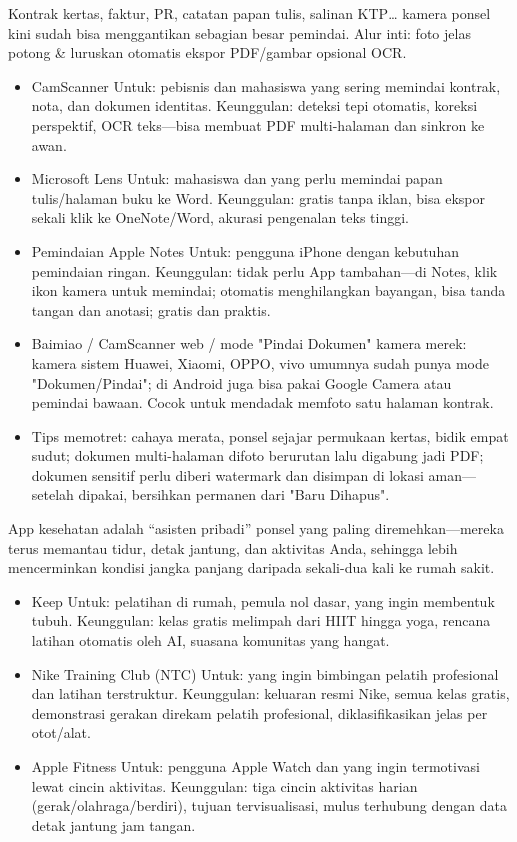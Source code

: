 Kontrak kertas, faktur, PR, catatan papan tulis, salinan KTP… kamera ponsel kini sudah bisa menggantikan sebagian besar pemindai. Alur inti: foto jelas potong \& luruskan otomatis ekspor PDF/gambar opsional OCR.

\begin{itemize}
  \item CamScanner Untuk: pebisnis dan mahasiswa yang sering memindai kontrak, nota, dan dokumen identitas. Keunggulan: deteksi tepi otomatis, koreksi perspektif, OCR teks—bisa membuat PDF multi-halaman dan sinkron ke awan.
  \item Microsoft Lens Untuk: mahasiswa dan yang perlu memindai papan tulis/halaman buku ke Word. Keunggulan: gratis tanpa iklan, bisa ekspor sekali klik ke OneNote/Word, akurasi pengenalan teks tinggi.
  \item Pemindaian Apple Notes Untuk: pengguna iPhone dengan kebutuhan pemindaian ringan. Keunggulan: tidak perlu App tambahan—di Notes, klik ikon kamera untuk memindai; otomatis menghilangkan bayangan, bisa tanda tangan dan anotasi; gratis dan praktis.
  \item Baimiao / CamScanner web / mode "Pindai Dokumen" kamera merek: kamera sistem Huawei, Xiaomi, OPPO, vivo umumnya sudah punya mode "Dokumen/Pindai"; di Android juga bisa pakai Google Camera atau pemindai bawaan. Cocok untuk mendadak memfoto satu halaman kontrak.
  \item Tips memotret: cahaya merata, ponsel sejajar permukaan kertas, bidik empat sudut; dokumen multi-halaman difoto berurutan lalu digabung jadi PDF; dokumen sensitif perlu diberi watermark dan disimpan di lokasi aman—setelah dipakai, bersihkan permanen dari "Baru Dihapus".
\end{itemize}


App kesehatan adalah “asisten pribadi” ponsel yang paling diremehkan—mereka terus memantau tidur, detak jantung, dan aktivitas Anda, sehingga lebih mencerminkan kondisi jangka panjang daripada sekali-dua kali ke rumah sakit.


\begin{itemize}
  \item Keep Untuk: pelatihan di rumah, pemula nol dasar, yang ingin membentuk tubuh. Keunggulan: kelas gratis melimpah dari HIIT hingga yoga, rencana latihan otomatis oleh AI, suasana komunitas yang hangat.
  \item Nike Training Club (NTC) Untuk: yang ingin bimbingan pelatih profesional dan latihan terstruktur. Keunggulan: keluaran resmi Nike, semua kelas gratis, demonstrasi gerakan direkam pelatih profesional, diklasifikasikan jelas per otot/alat.
  \item Apple Fitness Untuk: pengguna Apple Watch dan yang ingin termotivasi lewat cincin aktivitas. Keunggulan: tiga cincin aktivitas harian (gerak/olahraga/berdiri), tujuan tervisualisasi, mulus terhubung dengan data detak jantung jam tangan.
\end{itemize}

